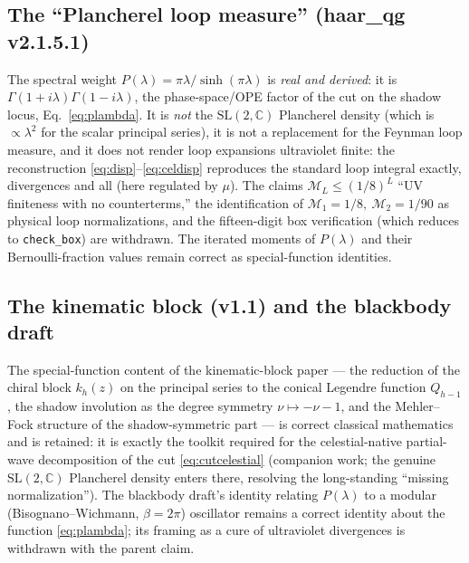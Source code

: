 \documentclass[12pt,a4paper]{article}
\theoremstyle{plain}
\theoremstyle{definition}
\theoremstyle{remark}
\newcommand{\C}{\mathbb{C}}
\newcommand{\cM}{\mathcal{M}}
\begin{document}
\subsection{The ``Plancherel loop measure'' (haar\_qg v2.1.5.1)}
The spectral weight $P(\lambda)=\pi\lambda/\sinh(\pi\lambda)$ is
\emph{real and derived}: it is
$\Gamma(1+i\lambda)\Gamma(1-i\lambda)$, the phase-space/OPE factor of
the cut on the shadow locus, Eq.~\eqref{eq:plambda}.  It is
\emph{not} the $\mathrm{SL}(2,\C)$ Plancherel density (which is
$\propto\lambda^2$ for the scalar principal series), it is not a
replacement for the Feynman loop measure, and it does not render loop
expansions ultraviolet finite: the reconstruction
\eqref{eq:disp}--\eqref{eq:celdisp} reproduces the standard loop
integral exactly, divergences and all (here regulated by $\mu$).  The
claims $\cM_L\le(1/8)^L$ ``UV finiteness with no counterterms,'' the
identification of $\cM_1=1/8,\ \cM_2=1/90$ as physical loop
normalizations, and the fifteen-digit box verification (which reduces
to \texttt{check\_box}) are withdrawn.  The iterated moments of
$P(\lambda)$ and their Bernoulli-fraction values remain correct as
special-function identities.

\subsection{The kinematic block (v1.1) and the blackbody draft}
The special-function content of the kinematic-block paper --- the
reduction of the chiral block $k_h(z)$ on the principal series to the
conical Legendre function $Q_{h-1}$, the shadow involution as the
degree symmetry $\nu\mapsto-\nu-1$, and the Mehler--Fock structure of
the shadow-symmetric part --- is correct classical mathematics and is
retained: it is exactly the toolkit required for the celestial-native
partial-wave decomposition of the cut \eqref{eq:cutcelestial}
(companion work; the genuine $\mathrm{SL}(2,\C)$ Plancherel density
enters there, resolving the long-standing ``missing normalization'').
The blackbody draft's identity relating $P(\lambda)$ to a modular
(Bisognano--Wichmann, $\beta=2\pi$) oscillator remains a correct
identity about the function \eqref{eq:plambda}; its framing as a cure
of ultraviolet divergences is withdrawn with the parent claim.

\end{document}
